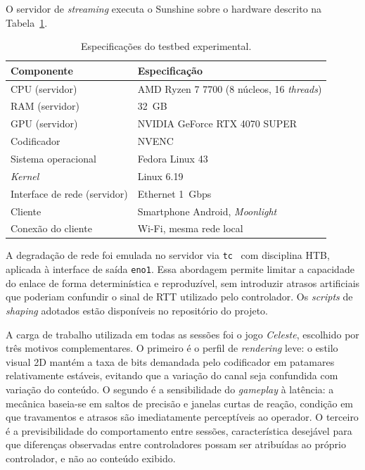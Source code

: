 \documentclass[conference]{IEEEtran}
\begin{document}
O servidor de \emph{streaming} executa o Sunshine sobre o
hardware descrito na Tabela~\ref{tab:testbed}.

\begin{table}[!t]
  \caption{Especificações do testbed experimental.}
  \label{tab:testbed}
  \centering
  \begin{tabular}{ll}
    \toprule
    \textbf{Componente} & \textbf{Especificação} \\
    \midrule
    CPU (servidor) & AMD Ryzen 7 7700 (8 núcleos, 16 \emph{threads}) \\
    RAM (servidor) & 32~GB \\
    GPU (servidor) & NVIDIA GeForce RTX 4070 SUPER \\
    Codificador & NVENC \\
    Sistema operacional & Fedora Linux 43 \\
    \emph{Kernel} & Linux 6.19 \\
    Interface de rede (servidor) & Ethernet 1~Gbps \\
    Cliente & Smartphone Android, \emph{Moonlight} \\
    Conexão do cliente & Wi-Fi, mesma rede local \\
    \bottomrule
  \end{tabular}
\end{table}

A degradação de rede foi emulada no servidor via \texttt{tc}~\cite{iproute2}
com disciplina HTB, aplicada à interface de saída \texttt{eno1}.
Essa abordagem permite limitar a capacidade do enlace de forma
determinística e reproduzível, sem introduzir atrasos
artificiais que poderiam confundir o sinal de RTT utilizado
pelo controlador. Os \emph{scripts} de \emph{shaping} adotados estão disponíveis
no repositório do projeto.

A carga de trabalho utilizada em todas as sessões foi o jogo
\emph{Celeste}, escolhido por três motivos complementares. O
primeiro é o perfil de \emph{rendering} leve: o estilo
visual 2D mantém a taxa de bits demandada pelo codificador em
patamares relativamente estáveis, evitando que a variação do
canal seja confundida com variação do conteúdo. O segundo é a
sensibilidade do \emph{gameplay} à latência: a mecânica
baseia-se em saltos de precisão e janelas curtas de reação,
condição em que travamentos e atrasos são imediatamente
perceptíveis ao operador. O terceiro é a previsibilidade do
comportamento entre sessões, característica desejável para que
diferenças observadas entre controladores possam ser atribuídas
ao próprio controlador, e não ao conteúdo exibido. 
\end{document}
